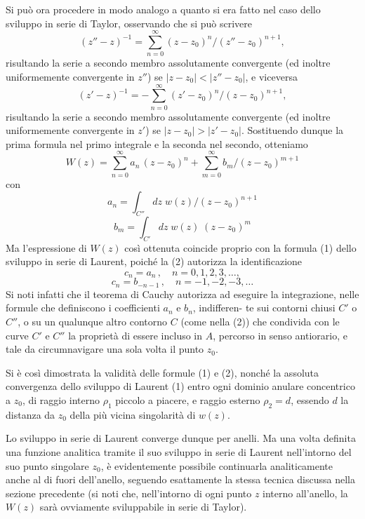 \documentclass[11pt, a4paper]{book}
\numberwithin{equation}{section}
\begin{document}
Si può ora procedere in modo analogo a quanto si era fatto nel caso dello sviluppo in serie di Taylor, osservando che si può scrivere
\[
(z''-z)^{-1} = \sum_{n=0}^{\infty} (z-z_0)^n \big/ (z''-z_0)^{n+1},
\]
risultando la serie a secondo membro assolutamente convergente (ed inoltre uniformemente convergente in $z''$) se $|z-z_0| < |z''-z_0|$, e viceversa
\[
(z'-z)^{-1} = -\sum_{n=0}^{\infty} (z'-z_0)^n \big/ (z-z_0)^{n+1},
\]
risultando la serie a secondo membro assolutamente convergente (ed inoltre uniformemente convergente in $z'$) se $|z-z_0| > |z'-z_0|$. Sostituendo dunque la prima formula nel primo integrale e la seconda nel secondo, otteniamo
\[
W(z) = \sum_{n=0}^{\infty} a_n\,(z-z_0)^n + \sum_{m=0}^{\infty} b_m \big/ (z-z_0)^{m+1}
\]
con
\[
a_n = \int_{C''} dz\; w(z) \big/ (z-z_0)^{n+1}
\]
\[
b_m = \int_{C'} dz\; w(z)\;(z-z_0)^m
\]
Ma l'espressione di $W(z)$ così ottenuta coincide proprio con la formula (1) dello sviluppo in serie di Laurent, poiché la (2) autorizza la identificazione
\[
c_n = a_n\,, \quad n = 0, 1, 2, 3, \ldots,
\]
\[
c_n = b_{-n-1}\,, \quad n = -1, -2, -3, \ldots
\]
Si noti infatti che il teorema di Cauchy autorizza ad eseguire la integrazione, nelle formule che definiscono i coefficienti $a_n$ e $b_n$, indifferen-%
te sui contorni chiusi $C'$ o $C''$, o su un qualunque altro contorno $C$ (come nella (2)) che condivida con le curve $C'$ e $C''$ la proprietà di essere incluso in $A$, percorso in senso antiorario, e tale da circumnavigare una sola volta il punto $z_0$.

Si è così dimostrata la validità delle formule (1) e (2), nonché la assoluta convergenza dello sviluppo di Laurent (1) entro ogni dominio anulare concentrico a $z_0$, di raggio interno $\rho_1$ piccolo a piacere, e raggio esterno $\rho_2 = d$, essendo $d$ la distanza da $z_0$ della più vicina singolarità di $w(z)$.

Lo sviluppo in serie di Laurent converge dunque per anelli. Ma una volta definita una funzione analitica tramite il suo sviluppo in serie di Laurent nell'intorno del suo punto singolare $z_0$, è evidentemente possibile continuarla analiticamente anche al di fuori dell'anello, seguendo esattamente la stessa tecnica discussa nella sezione precedente (si noti che, nell'intorno di ogni punto $z$ interno all'anello, la $W(z)$ sarà ovviamente sviluppabile in serie di Taylor).
\end{document}
